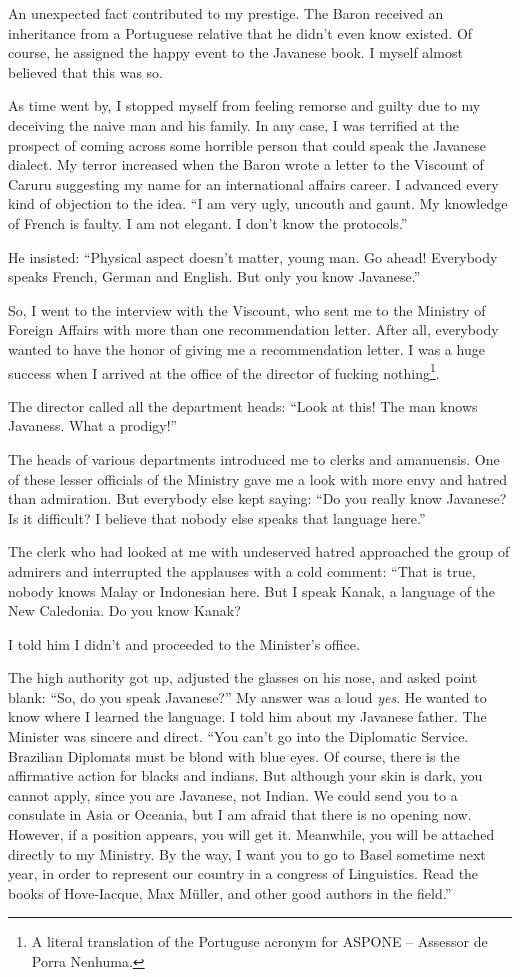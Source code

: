 \documentclass[a4paper,12pt]{book}
\begin{document}
An unexpected fact contributed to my
prestige. The Baron received an inheritance
from a Portuguese relative that he  didn't
even know existed. Of course, he assigned the
happy event to the Javanese book.
I myself almost believed that this was so.

As time went by, I stopped myself from
feeling remorse and guilty due to my deceiving
the naive man and his family. In any case,
I was terrified at the prospect of coming
across some horrible person that could
speak the Javanese dialect. My terror
increased when the Baron wrote a letter
to the Viscount of Caruru suggesting my
name for an international affairs career.
I advanced every kind of objection to the
idea. ``I am very ugly, uncouth and gaunt.
My knowledge of French
is faulty. I am not elegant.
I don't know the protocols.''

He insisted: ``Physical aspect doesn't matter, young man.
Go ahead! Everybody speaks French, German and English.
But only you know Javanese.''

So, I went to the interview with the Viscount,
who sent me to the Ministry of Foreign Affairs
with more than one recommendation letter.
After all, everybody wanted to have the
honor of giving me a recommendation letter.
I was a huge success when I arrived at
the office of the director
of fucking nothing\footnote{A literal translation
  of the Portuguse acronym for ASPONE -- Assessor de
Porra Nenhuma.}.

The director called all the department
heads: ``Look at this! The man
knows Javaness.  What a prodigy!''

The heads of various departments introduced me
to clerks and amanuensis.
One of these lesser officials of the Ministry
gave me a look with more envy and hatred than
admiration. But everybody else kept saying:
``Do you really know Javanese? Is it difficult?
I believe that nobody else speaks that language here.''

The clerk who had looked at me with undeserved
hatred approached the group of admirers and interrupted
the applauses with a cold comment: ``That is true,
nobody knows Malay or Indonesian here. But I speak
Kanak, a language of the New Caledonia. Do you
know Kanak?

I told him I didn't and proceeded
to the Minister's office.

The high authority got up, adjusted the
glasses on his nose, and asked point blank:
``So, do you speak Javanese?''
My answer was a loud {\em yes}.
He wanted to know where I learned the
language. I told him about my Javanese father.
The Minister was sincere and direct.
``You can't go into the Diplomatic Service.
Brazilian Diplomats must be blond with
blue eyes. Of course, there is the affirmative
action for blacks and indians. But although
your skin is dark, you cannot apply,
since you are Javanese, not Indian.
We could send you to a consulate in
Asia or Oceania, but I am afraid
that there is no opening now.
However, if a position appears, you will
get it. Meanwhile, you will be attached directly
to my Ministry. By the way,
I want you to go 
to Basel sometime next year, in order
to represent our country in a congress
of Linguistics. Read the books of
Hove-Iacque, Max Müller, and other
good authors in the field.''
\end{document}
